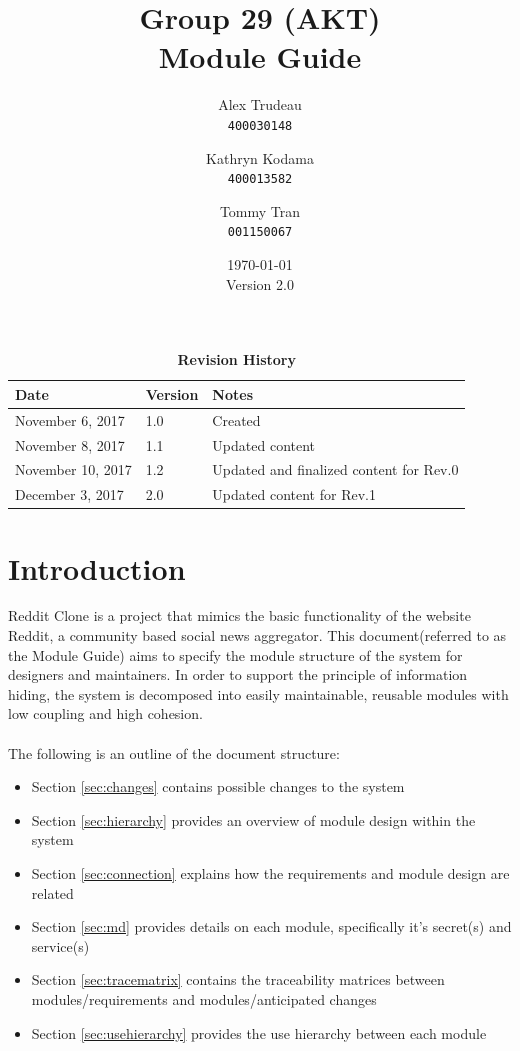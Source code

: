 \documentclass[12pt,fleqn]{article}
\title{Group 29 (AKT)\\ Module Guide}
\author{
Alex Trudeau\\
	\texttt{400030148}
\and
Kathryn Kodama\\
  	\texttt{400013582}
\and
Tommy Tran\\
	\texttt{001150067}
}
\date{\today\\ Version 2.0}
\begin{document}
\maketitle

\pagebreak

\tableofcontents
\listoftables
\listoffigures
\begin{table}[ht]
\caption{\bf Revision History}
\begin{tabularx}{\textwidth}{p{3cm}p{2cm}X}
\toprule {\bf Date} & {\bf Version} & {\bf Notes}\\
\midrule
November 6, 2017 & 1.0 & Created\\
November 8, 2017 & 1.1 & Updated content\\
November 10, 2017 & 1.2 & Updated and finalized content for Rev.0\\
December 3, 2017 & 2.0 & Updated content for Rev.1\\
\bottomrule
\end{tabularx}
\end{table}


\clearpage


\section{Introduction}
Reddit Clone is a project that mimics the basic functionality of the website Reddit, a community based social news aggregator. This document(referred to as the Module Guide) aims to specify the module structure of the system for designers and maintainers. In order to support the principle of information hiding, the system is decomposed into easily maintainable, reusable modules with low coupling and high cohesion.\\
\\
The following is an outline of the document structure:
\begin{itemize}
    \item Section \ref{sec:changes} contains possible changes to the system
    \item Section \ref{sec:hierarchy} provides an overview of module design within the system
    \item Section \ref{sec:connection} explains how the requirements and module design are related
    \item Section \ref{sec:md} provides details on each module, specifically it's  secret(s) and service(s)
    \item Section \ref{sec:tracematrix} contains the traceability matrices between modules/requirements and modules/anticipated changes
    \item Section \ref{sec:usehierarchy} provides the use hierarchy between each module
    
\end{itemize}
\end{document}
